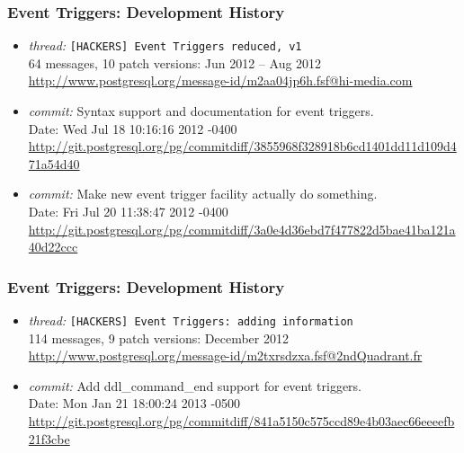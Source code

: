 \frame
{ \frametitle{Event Triggers: Development History}
\begin{itemize}

\item 
\textit{thread:} \texttt{[HACKERS] Event Triggers reduced, v1} \\
64 messages, 10 patch versions: Jun 2012 -- Aug 2012 \\
{\tiny \url{http://www.postgresql.org/message-id/m2aa04jp6h.fsf@hi-media.com}}

\item \textit{commit:}
Syntax support and documentation for event triggers. \\
Date: Wed Jul 18 10:16:16 2012 -0400
{\tiny \url{http://git.postgresql.org/pg/commitdiff/3855968f328918b6cd1401dd11d109d471a54d40}}

\item \textit{commit:}
Make new event trigger facility actually do something. \\
Date: Fri Jul 20 11:38:47 2012 -0400
{\tiny \url{http://git.postgresql.org/pg/commitdiff/3a0e4d36ebd7f477822d5bae41ba121a40d22ccc}}

\end{itemize}
}

\frame
{ \frametitle{Event Triggers: Development History}
\begin{itemize}

\item 
\textit{thread:} \texttt{[HACKERS] Event Triggers: adding information} \\
114 messages, 9 patch versions: December 2012 \\
{\tiny \url{http://www.postgresql.org/message-id/m2txrsdzxa.fsf@2ndQuadrant.fr}}

\item \textit{commit:}
Add ddl\_command\_end support for event triggers. \\
Date: Mon Jan 21 18:00:24 2013 -0500
{\tiny \url{http://git.postgresql.org/pg/commitdiff/841a5150c575ccd89e4b03aec66eeeefb21f3cbe}}

\end{itemize}
}

